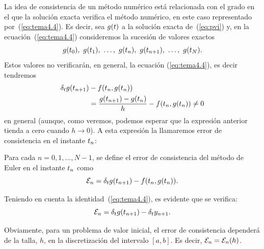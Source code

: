 La idea de consistencia de un método numérico está relacionada con el
grado en el que la solución exacta verifica el método numérico, en este caso representado por~(\ref{eq:tema4.4}). Es decir,
sea $g(t)$ a la solución exacta de~(\ref{eq:pvi}) y, en la
ecuación~(\ref{eq:tema4.4}) consideremos la sucesión de valores exactos
$$
g(t_0),\ g(t_1),\ \dots,\ g({t_n}),\ g({t_{n+1}}),\ \dots,\ g(t_N).
$$
Estos valores no verificarán, en general, la ecuación
(\ref{eq:tema4.4}), es decir tendremos
\begin{align*}
  \delta_t g({t_{n+1}}) &- f({t_n},g({t_n}))
  \\
  &= \frac{g({t_{n+1}})-g({t_n})}{h}
  - f({t_n},g({t_n}))
    \neq 0
\end{align*}
en general (aunque, como veremos, podemos esperar que la expresión anterior tienda a cero cuando $h\to 0$).
A esta expresión la llamaremos error de consistencia en el instante ${t_n}$:
\begin{definition}
  \label{def:error-consistencia-euler}
  Para cada $n=0,1,...,N-1$, se define el error de consistencia del método de
  Euler en el instante ${t_n}$ como
  \begin{equation}
    \label{eq:consistencia-euler}
    {\cal E}_{n} = \delta_t g({t_{n+1}})-f({t_n},g({t_n})).
  \end{equation}
\end{definition}
\begin{remark}
  Teniendo en cuenta la identidad~(\ref{eq:tema4.4}), es evidente que se verifica:
  $${\cal E}_{n} = \delta_t g({t_{n+1}})-\delta_t {y_{n+1}}.$$
\end{remark}
Obviamente, para un problema de valor inicial, el error de
consistencia dependerá de la talla, $h$, en la discretización del
intervalo $[a,b]$. Es decir, ${\cal E}_n={\cal E}_n(h)$.

